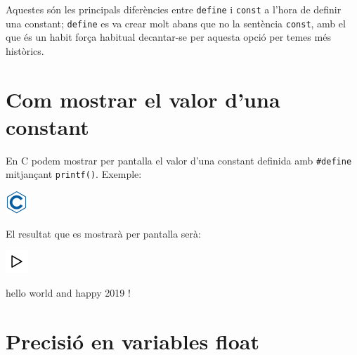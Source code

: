 \documentclass[]{book}
\newenvironment{Shaded}{\begin{snugshade}}{\end{snugshade}}
\newcommand{\DataTypeTok}[1]{\textcolor[rgb]{0.13,0.29,0.53}{#1}}
\newcommand{\DecValTok}[1]{\textcolor[rgb]{0.00,0.00,0.81}{#1}}
\newcommand{\SpecialCharTok}[1]{\textcolor[rgb]{0.00,0.00,0.00}{#1}}
\newcommand{\StringTok}[1]{\textcolor[rgb]{0.31,0.60,0.02}{#1}}
\newcommand{\ImportTok}[1]{#1}
\newcommand{\ControlFlowTok}[1]{\textcolor[rgb]{0.13,0.29,0.53}{\textbf{#1}}}
\newcommand{\PreprocessorTok}[1]{\textcolor[rgb]{0.56,0.35,0.01}{\textit{#1}}}
\newcommand{\NormalTok}[1]{#1}
\begin{document}
Aquestes són les principals diferències entre \texttt{define} i
\texttt{const} a l'hora de definir una constant; \texttt{define} es va
crear molt abans que no la sentència \texttt{const}, amb el que és un
habit força habitual decantar-se per aquesta opció per temes més
històrics.

\section{Com mostrar el valor d'una
constant}\label{com-mostrar-el-valor-duna-constant}

En C podem mostrar per pantalla el valor d'una constant definida amb
\texttt{\#define} mitjançant \texttt{printf()}. Exemple:

\includegraphics{./img/c.png}

\begin{Shaded}
\end{Shaded}

El resultat que es mostrarà per pantalla serà:

\includegraphics{./img/play.png}

\begin{Shaded}
\begin{Highlighting}[]
\NormalTok{hello world and happy }\DecValTok{2019}\NormalTok{ !}
\end{Highlighting}
\end{Shaded}

\section{Precisió en variables float}\label{precisio-en-variables-float}
\end{document}
